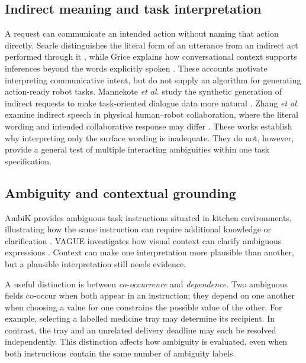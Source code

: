\documentclass[10pt,conference]{IEEEtran}
\begin{document}
\subsection{Indirect meaning and task interpretation}
A request can communicate an intended action without naming that action directly. Searle distinguishes the literal form of an utterance from an indirect act performed through it \cite{searle1975}, while Grice explains how conversational context supports inferences beyond the words explicitly spoken \cite{grice1975}. These accounts motivate interpreting communicative intent, but do not supply an algorithm for generating action-ready robot tasks. Mannekote \emph{et al.} study the synthetic generation of indirect requests to make task-oriented dialogue data more natural \cite{mannekote}. Zhang \emph{et al.} examine indirect speech in physical human--robot collaboration, where the literal wording and intended collaborative response may differ \cite{tool}. These works establish why interpreting only the surface wording is inadequate. They do not, however, provide a general test of multiple interacting ambiguities within one task specification.

\subsection{Ambiguity and contextual grounding}
AmbiK provides ambiguous task instructions situated in kitchen environments, illustrating how the same instruction can require additional knowledge or clarification \cite{ambik}. VAGUE investigates how visual context can clarify ambiguous expressions \cite{vague}. Context can make one interpretation more plausible than another, but a plausible interpretation still needs evidence.

A useful distinction is between \emph{co-occurrence} and \emph{dependence}. Two ambiguous fields co-occur when both appear in an instruction; they depend on one another when choosing a value for one constrains the possible value of the other. For example, selecting a labelled medicine tray may determine its recipient. In contrast, the tray and an unrelated delivery deadline may each be resolved independently. This distinction affects how ambiguity is evaluated, even when both instructions contain the same number of ambiguity labels.
\end{document}
